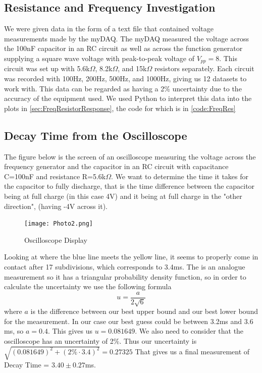 \documentclass[12pt]{article}
\numberwithin{equation}{section}
\numberwithin{figure}{section}
\begin{document}
    \subsection{Resistance and Frequency Investigation}
    We were given data in the form of a text file that contained voltage measurements made by the myDAQ. 
    The myDAQ measured the voltage across the 100nF capacitor in an RC circuit as well as across the 
    function generator supplying a square wave voltage with peak-to-peak voltage of $V_{pp}=8$. This circuit 
    was set up with 5.6k$\Omega$, 8.2k$\Omega$, and 15k$\Omega$ resistors separately. Each circuit was 
    recorded with 100Hz, 200Hz, 500Hz, and 1000Hz, giving us 12 datasets to work with. This data can be 
    regarded as having a 2\% uncertainty due to the accuracy of the equipment used. We used Python to 
    interpret this data into the plots in \autoref{sec:FreqResistorResponse}, the code for which is in
    \autoref{code:FreqRes}

    \subsection{Decay Time from the Oscilloscope}
    The figure below is the screen of an oscilloscope measuring the voltage across the frequency generator 
    and the capacitor in an RC circuit with capacitance C=100nF and resistance R=5.6k$\Omega$. We want to 
    determine the time it takes for the capacitor to fully discharge, that is the time difference between 
    the capacitor being at full charge (in this case 4V) and it being at full charge in the "other direction", 
    (having -4V across it).
    \begin{figure}[H]
        \begin{center}
           \texttt{[image: Photo2.png]}
           \caption{Oscilloscope Display}
           \label{fig:DecayTimeScreen}
        \end{center}
    \end{figure}
    Looking at where the blue line meets the yellow line, it seems to properly come in contact after 17 
    subdivisions, which corresponds to 3.4ms. The is an analogue measurement so it has a triangular 
    probability density function, so in order to calculate the uncertainty we use the following formula
    \begin{equation}
        u=\frac{a}{2\sqrt{6}}
    \end{equation}
    where $a$ is the difference between our best upper bound and our best lower bound for the measurement. 
    In our case our best guess could be between 3.2ms and 3.6 ms, so $a=0.4$. This gives us $u=0.081649$. 
    We also need to consider that the oscilloscope has an uncertainty of 2\%. Thus our uncertainty is 
    $\sqrt{(0.081649)^2+(2\%\cdot 3.4)^2}=0.27325$
    That gives us a final measurement of Decay Time = $3.40\pm 0.27$ms. 
\end{document}
